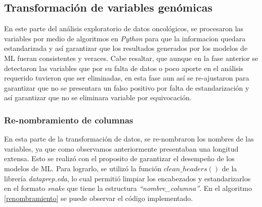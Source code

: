 \newpage
\subsection{Transformación de variables genómicas}
En este parte del análisis exploratorio de datos oncológicos, se procesaron las variables por medio de algoritmos en \textit{Python} para que la informacion quedara estandarizada y así garantizar que los resultados generados por los modelos de ML fueran consistentes y veraces. Cabe resaltar, que aunque en la fase anterior se detectaron las variables que por su falta de datos o poco aporte en el análisis requerido tuvieron que ser eliminadas, en esta fase aun así se re-ajustaron para garantizar que no se presentara un falso positivo por falta de estandarización y así garantizar que no se eliminara variable por equivocación.

\subsubsection{Re-nombramiento de columnas}
En esta parte de la transformación de datos, se re-nombraron los nombres de las variables, ya que como observamos anteriormente presentaban una longitud extensa. Esto se realizó con el proposito de garantizar el desempeño de los modelos de ML. Para lograrlo, se utilizó la función $clean\_headers()$ de la librería \textit{dataprep.eda}, lo cual permitió limpiar los encabezados y estandarizarlos en el formato \textit{snake} que tiene la estructura \textit{“nombre\_columna”}. En el algoritmo \ref{renombramiento} se puede observar el código implementado.

